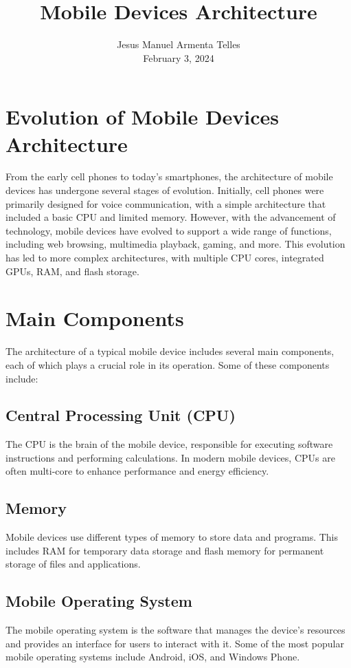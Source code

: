 \documentclass[journal]{IEEEtran}
\title{Mobile Devices Architecture}
\author{Jesus Manuel Armenta Telles  \\ \large February 3, 2024}
\begin{document}
	
	\maketitle
	
	\section{Evolution of Mobile Devices Architecture}
	From the early cell phones to today's smartphones, the architecture of mobile devices has undergone several stages of evolution. Initially, cell phones were primarily designed for voice communication, with a simple architecture that included a basic CPU and limited memory. However, with the advancement of technology, mobile devices have evolved to support a wide range of functions, including web browsing, multimedia playback, gaming, and more. This evolution has led to more complex architectures, with multiple CPU cores, integrated GPUs, RAM, and flash storage.
	
	\section{Main Components}
	The architecture of a typical mobile device includes several main components, each of which plays a crucial role in its operation. Some of these components include:
	
	\subsection{Central Processing Unit (CPU)}
	The CPU is the brain of the mobile device, responsible for executing software instructions and performing calculations. In modern mobile devices, CPUs are often multi-core to enhance performance and energy efficiency.
	
	\subsection{Memory}
	Mobile devices use different types of memory to store data and programs. This includes RAM for temporary data storage and flash memory for permanent storage of files and applications.
	
	\subsection{Mobile Operating System}
	The mobile operating system is the software that manages the device's resources and provides an interface for users to interact with it. Some of the most popular mobile operating systems include Android, iOS, and Windows Phone.
	
\end{document}
